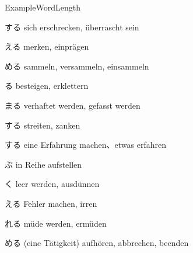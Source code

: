 \begin{multicols*}{2}
\begin{flushleft}
\begin{labeling}{ExampleWordLength}
	\item [\ruby{吃驚}{びっくり}する] sich erschrecken, überrascht sein
	\item [\ruby{覚}{おぼ}える] merken, einprägen
	\item [\ruby{集}{あつ}める] sammeln, versammeln, einsammeln
	\item [\ruby{上る}{のぼ}る] besteigen, erklettern
	\item [\ruby{捕まる}{つか}まる] verhaftet werden, gefasst werden
	\item [\ruby{喧嘩}{けんか}する] streiten, zanken
	\item [\ruby{経験}{けいけん}する] eine Erfahrung machen、etwas erfahren
	\item [\ruby{並}{なら}ぶ] in Reihe aufstellen
	\item [\ruby{空}{す}く] leer werden, ausdünnen
	\item [\ruby{間違}{まちが}える] Fehler machen, irren
	\item [\ruby{疲}{つか}れる] müde werden, ermüden
	\item [\ruby{止}{や}める] (eine Tätigkeit) aufhören, abbrechen, beenden
\end{labeling}
\end{flushleft}
\end{multicols*}

\clearpage